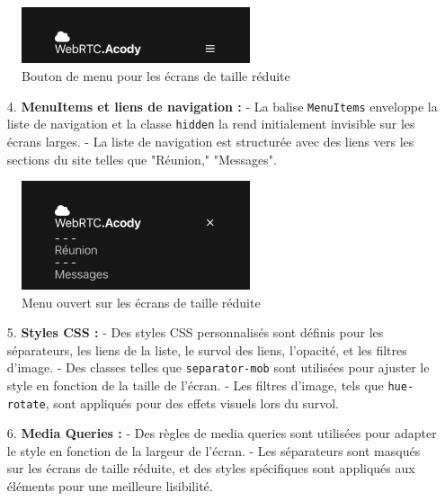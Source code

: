 \documentclass[12pt, a4paper, oneside]{thesis}
\begin{document}
\begin{figure}[h]
    \centering
    \includegraphics[width=0.6\textwidth]{images/NavBarMobileClose.png}
    \caption{Bouton de menu pour les écrans de taille réduite}
\end{figure}

\begin{enumerate}
    \item[4.] \textbf{MenuItems et liens de navigation :}
    - La balise \texttt{MenuItems} enveloppe la liste de navigation et la classe \texttt{hidden} la rend initialement invisible sur les écrans larges.
    - La liste de navigation est structurée avec des liens vers les sections du site telles que "Réunion," "Messages".

\end{enumerate}

\begin{figure}[h]
    \centering
    \includegraphics[width=0.6\textwidth]{images/NavBarMobileOpen.png}
    \caption{Menu ouvert sur les écrans de taille réduite}
\end{figure}

\begin{enumerate}
    \item[5.] \textbf{Styles CSS :}
    - Des styles CSS personnalisés sont définis pour les séparateurs, les liens de la liste, le survol des liens, l'opacité, et les filtres d'image.
    - Des classes telles que \texttt{separator-mob} sont utilisées pour ajuster le style en fonction de la taille de l'écran.
    - Les filtres d'image, tels que \texttt{hue-rotate}, sont appliqués pour des effets visuels lors du survol.

    \item[6.] \textbf{Media Queries :}
    - Des règles de media queries sont utilisées pour adapter le style en fonction de la largeur de l'écran.
    - Les séparateurs sont masqués sur les écrans de taille réduite, et des styles spécifiques sont appliqués aux éléments pour une meilleure lisibilité.
\end{enumerate}
\end{document}
